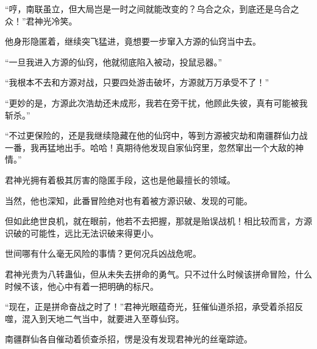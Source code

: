 \begin{this_body}
“哼，南联虽立，但大局岂是一时之间就能改变的？乌合之众，到底还是乌合之众！”君神光冷笑。

他身形隐匿着，继续突飞猛进，竟想要一步窜入方源的仙窍当中去。

“一旦我进入方源的仙窍，他就彻底陷入被动，投鼠忌器。”

“我根本不去和方源对战，只要四处游击破坏，方源就万万承受不了！”

“更妙的是，方源此次浩劫还未成形，我若在旁干扰，他顾此失彼，真有可能被我斩杀。”

“不过更保险的，还是我继续隐藏在他的仙窍中，等到方源被灾劫和南疆群仙力战一番，我再猛地出手。哈哈！真期待他发现自家仙窍里，忽然窜出一个大敌的神情。”

君神光拥有着极其厉害的隐匿手段，这也是他最擅长的领域。

当然，他也深知，此番冒险绝对也有着被方源识破、发现的可能。

但如此绝世良机，就在眼前，他若不去把握，那就是贻误战机！相比较而言，方源识破的可能性，远比无法识破来得更小。

世间哪有什么毫无风险的事情？更何况兵凶战危呢。

君神光贵为八转蛊仙，但从未失去拼命的勇气。只不过什么时候该拼命冒险，什么时候不该，他心中有着一把明确的标尺。

“现在，正是拼命奋战之时了！”君神光眼蕴奇光，狂催仙道杀招，承受着杀招反噬，混入到天地二气当中，就要进入至尊仙窍。

南疆群仙各自催动着侦查杀招，愣是没有发现君神光的丝毫踪迹。

\end{this_body}

